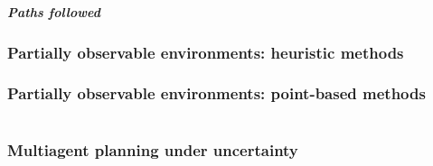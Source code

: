 \documentclass[10pt,a4paper]{article}
\begin{document}
\subsubsection*{Paths followed}


\section{Partially observable environments: heuristic methods}


\section{Partially observable environments: point-based methods}


\part{}


\section{Multiagent planning under uncertainty}
\end{document}
